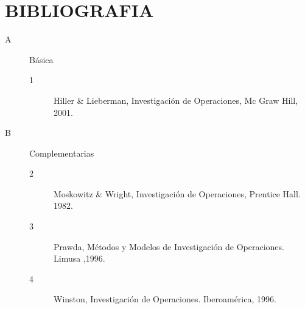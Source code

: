 \documentclass{article}
\begin{document}
\section*{BIBLIOGRAFIA}
\begin{description}
\item[A] B\'asica
\begin{description}
\item[1] Hiller \& Lieberman, Investigaci\'on de Operaciones, Mc Graw Hill, 2001.
\end{description}
\item[B] Complementarias
\begin{description}
\item[2] Moskowitz \& Wright, Investigaci\'on de Operaciones, Prentice Hall. 1982.
\item[3] Prawda, M\'etodos y Modelos de Investigaci\'on de Operaciones. Limusa ,1996.
\item[4] Winston, Investigaci\'on de Operaciones. Iberoam\'erica, 1996. 
\end{description}
\end{description}
\end{document}
